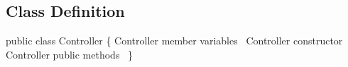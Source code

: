 \documentclass{article}
\def\nwendcode{\endtrivlist \endgroup}      %
\let\nwdocspar=\par
\begin{document}
\subsection{Class Definition}
\label{sec:class-definition}
\nwenddocs{}\endmoddef{}
public class Controller \{
  \LA{}\code{}Controller\edoc{} member variables~{\nwtagstyle{}}\RA{}
  \LA{}\code{}Controller\edoc{} constructor~{\nwtagstyle{}}\RA{}
  \LA{}\code{}Controller\edoc{} public methods~{\nwtagstyle{}}\RA{}
\}
\nwendcode{}\nwdocspar
\end{document}
